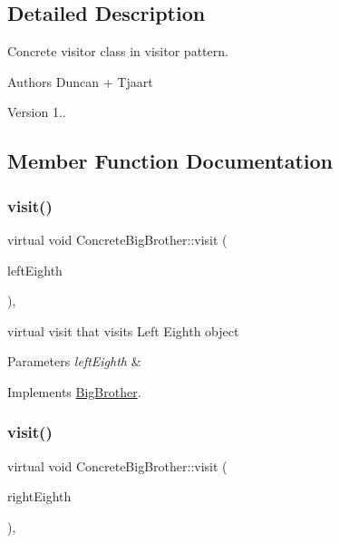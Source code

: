 \subsection{Detailed Description}
Concrete visitor class in visitor pattern. 

\begin{DoxyAuthor}{Authors}
Duncan + Tjaart 
\end{DoxyAuthor}
\begin{DoxyVersion}{Version}
1.. 
\end{DoxyVersion}


\subsection{Member Function Documentation}
\mbox{\label{class_concrete_big_brother_a9c9e11e8ed4b7a2c0c33850f481f4402}} 
\subsubsection{\texorpdfstring{visit()}{visit()}\hspace{0.1cm}{\footnotesize\ttfamily [1/7]}}
{\footnotesize\ttfamily virtual void Concrete\+Big\+Brother\+::visit (\begin{DoxyParamCaption}\item[{\mbox{\hyperlink{class_left_eighth}{Left\+Eighth}} $\ast$}]{left\+Eighth }\end{DoxyParamCaption})\hspace{0.3cm}{\ttfamily [inline]}, {\ttfamily [virtual]}}

virtual visit that visits Left Eighth object 
\begin{DoxyParams}{Parameters}
{\em left\+Eighth} & \\
\hline
\end{DoxyParams}


Implements \mbox{\hyperlink{class_big_brother_a2fabe9f19796ca5b9882ed3d8c8901d0}{Big\+Brother}}.

\mbox{\label{class_concrete_big_brother_a693ed9fb8fb4a18843f6a8d8abb878d4}} 
\subsubsection{\texorpdfstring{visit()}{visit()}\hspace{0.1cm}{\footnotesize\ttfamily [2/7]}}
{\footnotesize\ttfamily virtual void Concrete\+Big\+Brother\+::visit (\begin{DoxyParamCaption}\item[{\mbox{\hyperlink{class_right_eighth}{Right\+Eighth}} $\ast$}]{right\+Eighth }\end{DoxyParamCaption})\hspace{0.3cm}{\ttfamily [inline]}, {\ttfamily [virtual]}}

